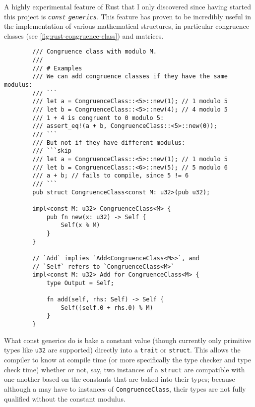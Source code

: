 \documentclass{report}
\newenvironment{code}{\captionsetup{type=listing}}{}
\begin{document}
A highly experimental feature of Rust that I only discovered since having
started this project is \emph{\Verb+const+ \Verb+generics+}. This feature has proven to
be incredibly useful in the implementation of various mathematical structures,
in particular congruence classes (see \cref{fig:rust-congruence-class}) and
matrices.
\begin{code}
    \begin{verbatim}
        /// Congruence class with modulo M.
        ///
        /// # Examples
        /// We can add congruence classes if they have the same modulus:
        /// ```
        /// let a = CongruenceClass::<5>::new(1); // 1 modulo 5
        /// let b = CongruenceClass::<5>::new(4); // 4 modulo 5
        /// 1 + 4 is congruent to 0 modulo 5:
        /// assert_eq!(a + b, CongruenceClass::<5>::new(0));
        /// ```
        /// But not if they have different modulus:
        /// ```skip
        /// let a = CongruenceClass::<5>::new(1); // 1 modulo 5
        /// let b = CongruenceClass::<6>::new(5); // 5 modulo 6
        /// a + b; // fails to compile, since 5 != 6
        /// ```
        pub struct CongruenceClass<const M: u32>(pub u32);

        impl<const M: u32> CongruenceClass<M> {
            pub fn new(x: u32) -> Self {
                Self(x % M)
            }
        }

        // `Add` implies `Add<CongruenceClass<M>>`, and
        // `Self` refers to `CongruenceClass<M>`
        impl<const M: u32> Add for CongruenceClass<M> {
            type Output = Self;

            fn add(self, rhs: Self) -> Self {
                Self((self.0 + rhs.0) % M)
            }
        }
    \end{verbatim}
    \caption{%
        Excerpt of my implementation of congruence classes in Rust,
        using traits and the const generic feature.
    }
    \label{fig:rust-congruence-class}
\end{code}
\noindent
What const generics do is bake a constant value (though currently
only primitive types like \Verb+u32+ are supported) directly into a \Verb+trait+
or \Verb+struct+. This allows the compiler to know at compile time (or more
specifically the type checker and type check time) whether or not, say, two
instances of a \Verb+struct+ are compatible with one-another based on the
constants that are baked into their types; because although a may have to
instances of \Verb+CongruenceClass+, their types are not fully qualified
without the constant modulus.
\end{document}
